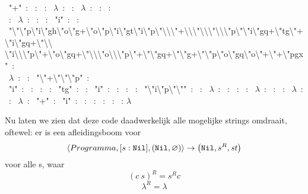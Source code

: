 \begin{smurf}
	\footnotesize
	
	\StmPush~"+"~: 
	\StmInput~: 
	\StmCat~: 
	\StmPush~$\lambda$~: 
	\StmPut~: 
	\StmPush~$\lambda$~: 
	\StmGet~: 
	\StmTail~:\\
	\StmGet~: 
	\StmPush~$\lambda$~: 
	\StmGet~: 
	\StmTail~: 
	\StmPush~"i"~: 
	\StmPut~:\\
	\StmPush~"\textbackslash{}"\textbackslash{}"p\textbackslash{}"i\textbackslash{}"gh\textbackslash{}"o\textbackslash{}"g+\textbackslash{}"o\textbackslash{}"p\textbackslash{}"i\textbackslash{}"gt\textbackslash{}"i\textbackslash{}"p\textbackslash{}"\textbackslash{}\textbackslash{}\textbackslash{}"+\textbackslash{}\textbackslash{}\textbackslash{}"\textbackslash{}\textbackslash{}\textbackslash{}"\textbackslash{}\textbackslash{}\textbackslash{}"p\textbackslash{}"\textbackslash{}"i\textbackslash{}"gq+\textbackslash{}"tg\textbackslash{}"+\textbackslash{}"i\textbackslash{}"gq+\textbackslash{}"\textbackslash{}\textbackslash{}\\
    \textbackslash{}"i\textbackslash{}\textbackslash{}\textbackslash{}"p\textbackslash{}"+\textbackslash{}"o\textbackslash{}"gq+\textbackslash{}"\textbackslash{}\textbackslash{}\textbackslash{}"o\textbackslash{}\textbackslash{}\textbackslash{}"p\textbackslash{}"+\textbackslash{}"\textbackslash{}"gq+\textbackslash{}"\textbackslash{}"g+\textbackslash{}"\textbackslash{}"p\textbackslash{}"o\textbackslash{}"gq\textbackslash{}"o\textbackslash{}"+\textbackslash{}"+\textbackslash{}"pgx"~:\\
	\StmPush~$\lambda$~: 
	\StmPut~: 
	\StmPush~"\textbackslash{}"+\textbackslash{}"\textbackslash{}"\textbackslash{}"p"~:\\
	\StmPush~"i"~: 
	\StmGet~: 
	\StmQuotify~: 
	\StmCat~: 
	\StmPush~"tg"~: 
	\StmCat~: 
	\StmPush~"i"~: 
	\StmGet~: 
	\StmQuotify~: 
	\StmCat~: 
	\StmPush~"\textbackslash{}"i\textbackslash{}"p\textbackslash{}"\textbackslash{}""~: 
	\StmCat~: 
	\StmPush~$\lambda$~: 
	\StmGet~: 
	\StmQuotify~: 
	\StmCat~: 
	\StmPush~$\lambda$~: 
	\StmGet~: 
	\StmCat~: 
	\StmPush~$\lambda$~: 
	\StmPut~: 
	\StmPush~$\lambda$~: 
	\StmPush~"+"~: 
	\StmPush~"i"~: 
	\StmGet~: 
	\StmCat~: 
	\StmPut~: 
	\StmGet~: 
	\StmExec~: 
    $\lambda$

    
\end{smurf}

Nu laten we zien dat deze code daadwerkelijk alle mogelijke strings omdraait,
oftewel: er is een afleidingsboom voor
$$
\left\langle Programma,[s:\texttt{Nil}],(\texttt{Nil},\varnothing)\right\rangle\to\left(\texttt{Nil},s^R,\mathit{st}\right)
$$
voor alle s, waar
$$(c~s)^R=s^R c$$
$$\lambda^R=\lambda$$

